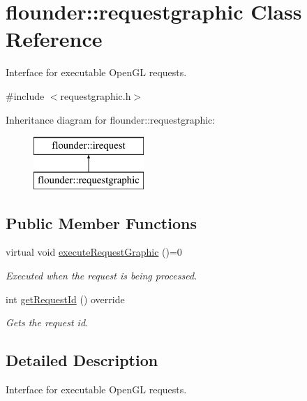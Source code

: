 \hypertarget{classflounder_1_1requestgraphic}{}\section{flounder\+:\+:requestgraphic Class Reference}
\label{classflounder_1_1requestgraphic}


Interface for executable Open\+GL requests.  




{\ttfamily \#include $<$requestgraphic.\+h$>$}

Inheritance diagram for flounder\+:\+:requestgraphic\+:\begin{figure}[H]
\begin{center}
\leavevmode
\includegraphics[height=2.000000cm]{classflounder_1_1requestgraphic}
\end{center}
\end{figure}
\subsection*{Public Member Functions}
\begin{DoxyCompactItemize}
\item 
virtual void \hyperlink{classflounder_1_1requestgraphic_aa4bff2170113f2c96b0b7acf20c81cd7}{execute\+Request\+Graphic} ()=0
\begin{DoxyCompactList}\small\item\em Executed when the request is being processed. \end{DoxyCompactList}\item 
int \hyperlink{classflounder_1_1requestgraphic_adc8967c8b3db4d7e932cdeee346a31ff}{get\+Request\+Id} () override
\begin{DoxyCompactList}\small\item\em Gets the request id. \end{DoxyCompactList}\end{DoxyCompactItemize}


\subsection{Detailed Description}
Interface for executable Open\+GL requests. 



